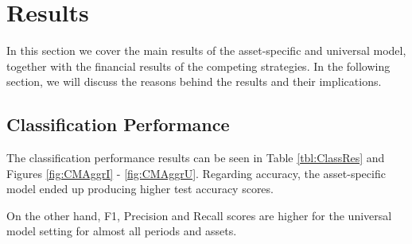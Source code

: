 \documentclass[11pt, a4paper]{article}
\begin{document}
\section{Results}
\label{sec:ER}

In this section we cover the main results of the asset-specific and universal model, together with the financial results of the competing strategies. In the following section, we will discuss the reasons behind the results and their implications.

\subsection{Classification Performance}
\label{subsec:ER:ClassPerf}

The classification performance results can be seen in Table \ref{tbl:ClassRes} and Figures \ref{fig:CMAggrI} - \ref{fig:CMAggrU}.
Regarding accuracy, the asset-specific model ended up producing higher test accuracy scores. 

On the other hand, F1, Precision and Recall scores are higher for the universal model setting for almost all periods and assets.
\end{document}

